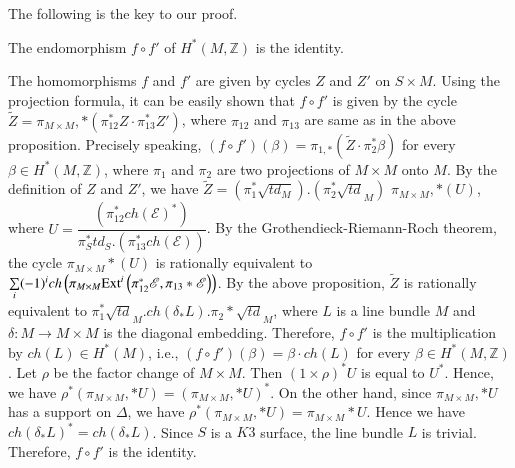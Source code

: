 \begin{pf}
The following is the key to our proof. 
\begin{claim}
The endomorphism $f\circ f'$ of $H^{\ast}(M,\mathbb{Z})$ is the identity.
\end{claim}

The homomorphisms $f$ and $f'$ are given by cycles $Z$ and $Z'$ on
$S\times M$. Using the projection formula, it can be easily shown that
$f\circ f'$ is given by the cycle $\widetilde{Z}=\pi_{M\times
M},\ast\left(\pi^{\ast}_{12}Z\cdot \pi^{\ast}_{1 3} Z'\right)$, where
$\pi_{1 2}$ and $\pi_{1 3}$ are same as in the above
proposition. Precisely speaking, $(f\circ
f')(\beta)=\pi_{1,\ast}\left(\widetilde{Z}\cdot \pi^{\ast}_2\beta\right)$
for every $\beta \in H^{\ast}(M,\mathbb{Z})$, where $\pi_1$ and
$\pi_2$ are two projections of $M\times M$ onto $M$. By the definition
of $Z$ and $Z'$, we have $\widetilde{Z}=\left(\pi^{\ast}_1\sqrt{t
d_M}\right).\left(\pi_2^{\ast}\sqrt{td}_M\right)$ $\pi_{M\times
M},\ast (U)$, where $U=\dfrac{\left(\pi_{1
2}^{\ast}ch(\mathscr{E})^{\ast}\right)}{\pi_S^{\ast}td_S.\left(\pi^{\ast}_{1
3}ch\left(\mathscr{E}\right)\right)}$. By the Grothendieck-Riemann-Roch
theorem, the cycle $\pi_{M\times M}\ast(U)$ is rationally equivalent
to $\sum\limits_{i}(-1)^{i}ch\left(\pi_{M\times
M}\mathrm{Ext}^{i}\left(\pi^{\ast}_{1
2}\mathscr{E},\pi_{13}\ast\mathscr{E}\right)\right)$. By the above
proposition, $\widetilde{Z}$ is rationally equivalent to
$\pi_1^{\ast}\sqrt{td}_M.ch(\delta_{\ast}L).\pi_2\ast\sqrt{td}_M$,
where $L$ is a line bundle $M$ and $\delta:M\to M\times M$ is the
diagonal embedding. Therefore, $f\circ f'$ is the multiplication by
$ch(L)\in H^{\ast}(M)$, i.e., $(f\circ f')(\beta)=\beta\cdot ch(L)$
for every $\beta\in H^{\ast}(M,\mathbb{Z})$. Let $\rho$ be the factor
change of $M\times M$. Then $(1\times \rho)^{\ast}U$ is equal to
$U^{\ast}$. Hence, we have $\rho^{\ast}(\pi_{M\times M},\ast
U)=(\pi_{M\times M},\ast U)^{\ast}$. On the other hand, since
$\pi_{M\times M},\ast U$ has a support on $\Delta$, we have
$\rho^{\ast}(\pi_{M\times M},\ast U)=\pi_{M\times M}\ast U$. Hence we
have $ch(\delta_{\ast}L)^{\ast}=ch(\delta_{\ast}L)$. Since $S$ is a
$K3$ surface, the line bundle $L$ is trivial. Therefore, $f\circ f'$
is the identity. 


\end{pf}
